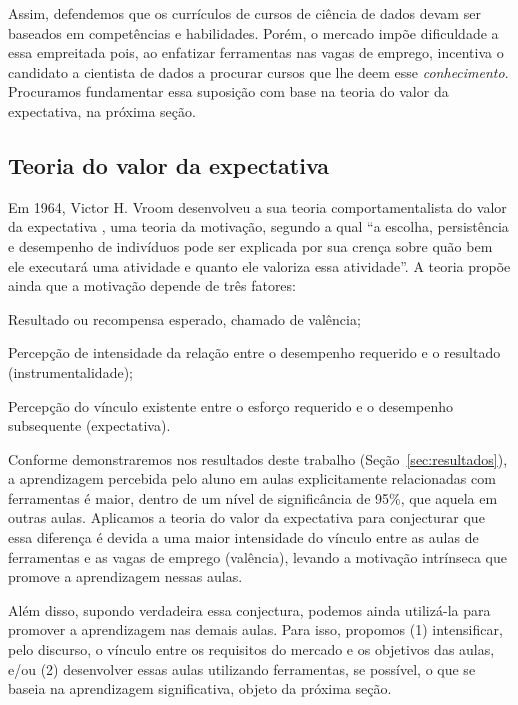 Assim, defendemos que os currículos de cursos de ciência de dados devam ser baseados em competências e habilidades.
Porém, o mercado impõe dificuldade a essa empreitada pois, ao enfatizar ferramentas nas vagas de emprego, incentiva o candidato a cientista de dados a procurar cursos que lhe deem esse \emph{conhecimento}.
Procuramos fundamentar essa suposição com base na teoria do valor da expectativa, na próxima seção.

\subsection{Teoria do valor da expectativa}\label{sec:tve}

Em 1964, Victor H. Vroom desenvolveu a sua teoria comportamentalista do valor da expectativa \cite{Petri}, uma teoria da motivação, segundo a qual ``a escolha, persistência e desempenho de indivíduos pode ser explicada por sua crença sobre quão bem ele executará uma atividade e quanto ele valoriza essa atividade''.
A teoria propõe ainda que a motivação depende de três fatores: 
\begin{compactitem}
	\item Resultado ou recompensa esperado, chamado de valência;
	\item Percepção de intensidade da relação entre o desempenho requerido e o resultado (instrumentalidade);
	\item Percepção do vínculo existente entre o esforço requerido e o desempenho subsequente (expectativa).
\end{compactitem}

Conforme demonstraremos nos resultados deste trabalho (Seção~\ref{sec:resultados}), a aprendizagem percebida pelo aluno em aulas explicitamente relacionadas com ferramentas é maior, dentro de um nível de significância de 95\%, que aquela em outras aulas.
Aplicamos a teoria do valor da expectativa para conjecturar que essa diferença é devida a uma maior intensidade do vínculo entre as aulas de ferramentas e as vagas de emprego (valência), levando a motivação intrínseca que promove a aprendizagem nessas aulas.

Além disso, supondo verdadeira essa conjectura, podemos ainda utilizá-la para promover a aprendizagem nas demais aulas.
Para isso, propomos (1) intensificar, pelo discurso, o vínculo entre os requisitos do mercado e os objetivos das aulas, e/ou (2) desenvolver essas aulas utilizando ferramentas, se possível, o que se baseia na aprendizagem significativa, objeto da próxima seção.

